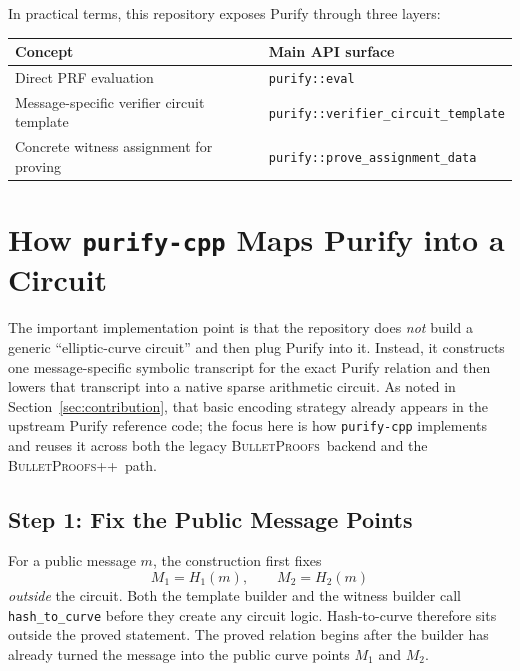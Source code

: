 \documentclass[11pt]{article}
\DeclareRobustCommand{\bp}{{\normalfont\scshape BulletProofs}}
\DeclareRobustCommand{\bppp}{{\normalfont\scshape BulletProofs++}}
\begin{document}
In practical terms, this repository exposes Purify through three layers:
\begin{center}
\begin{tabular}{@{}ll@{}}
\toprule
Concept & Main API surface \\
\midrule
Direct PRF evaluation & \texttt{purify::eval} \\
Message-specific verifier circuit template & \texttt{purify::verifier\_circuit\_template} \\
Concrete witness assignment for proving & \texttt{purify::prove\_assignment\_data} \\
\bottomrule
\end{tabular}
\end{center}

\section{How \texttt{purify-cpp} Maps Purify into a Circuit}

The important implementation point is that the repository does \emph{not} build a generic
``elliptic-curve circuit'' and then plug Purify into it. Instead, it constructs one
message-specific symbolic transcript for the exact Purify relation and then lowers that transcript
into a native sparse arithmetic circuit.
As noted in Section~\ref{sec:contribution}, that basic encoding
strategy already appears in the
upstream Purify reference code; the focus here is how
\texttt{purify-cpp} implements and reuses it
across both the legacy \bp\ backend and the \bppp\ path.

\subsection{Step 1: Fix the Public Message Points}

For a public message $m$, the construction first fixes
\[
M_1 = H_1(m), \qquad M_2 = H_2(m)
\]
\emph{outside} the circuit. Both the template builder and the witness builder call
\texttt{hash\_to\_curve} before they create any circuit logic. Hash-to-curve therefore sits outside
the proved statement. The proved relation begins after the builder has already turned the message into the public curve
points $M_1$ and $M_2$.
\end{document}
